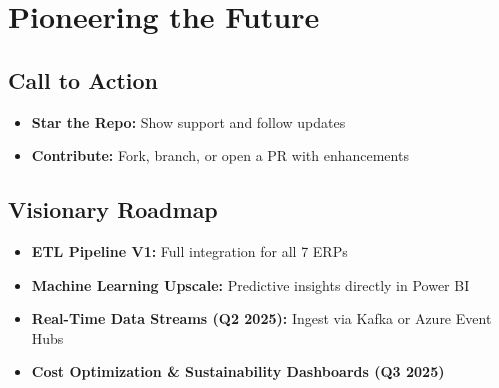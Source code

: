 \documentclass[a4paper,10pt]{article}
\begin{document}
\chapter{Pioneering the Future}

\section{Call to Action}
\begin{itemize}[leftmargin=2em]
    \item \textbf{Star the Repo:} Show support and follow updates
    \item \textbf{Contribute:} Fork, branch, or open a PR with enhancements
\end{itemize}

\section{Visionary Roadmap}
\begin{itemize}[leftmargin=2em]
    \item \textbf{ETL Pipeline V1:} Full integration for all 7 ERPs
    \item \textbf{Machine Learning Upscale:} Predictive insights directly in Power BI
    \item \textbf{Real-Time Data Streams (Q2 2025):} Ingest via Kafka or Azure Event Hubs
    \item \textbf{Cost Optimization \& Sustainability Dashboards (Q3 2025)}
\end{itemize}
\end{document}
